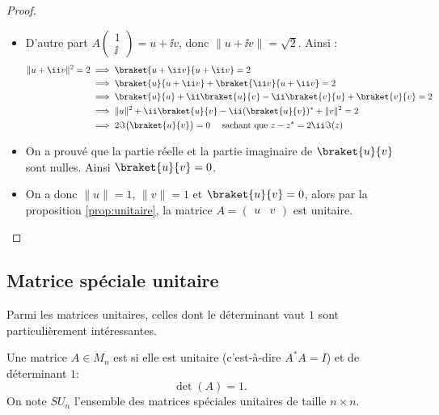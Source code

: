 \documentclass[11pt,class=report,crop=false]{standalone}
\begin{document}
\begin{proof}
\begin{itemize}
\begin{itemize}
  \item D'autre part $A \left(\begin{smallmatrix}1\\\ii\end{smallmatrix}\right) = u+\ii v$,
  donc $\|u+\ii v\| = \sqrt2$.
  Ainsi :
  \begin{align*}
  \|u+ \ii v\|^2 = 2 
   &\implies \braket{u+\ii v}{u+\ii v} = 2 \\
   &\implies \braket{u}{u+\ii v} + \braket{\ii v}{u+\ii v} = 2 \\
   &\implies \braket{u}{u} + \ii\braket{u}{v} -\ii\braket{v}{u} +\braket{v}{v} = 2 \\
   &\implies \|u\|^2 + \ii\braket{u}{v} - \ii(\braket{u}{v})^* + \|v\|^2 = 2 \\
   &\implies 2\Im\big( \braket{u}{v} \big) = 0 \quad \text{ sachant que } z-z^* = 2\ii\Im(z)\\
  \end{align*}
  
  \item On a prouvé que la partie réelle et la partie imaginaire de $\braket{u}{v}$ sont nulles. Ainsi $\braket{u}{v} = 0$.
  
  \item On a donc $\|u\|=1$, $\|v\|=1$ et $\braket{u}{v}=0$, alors par la proposition \ref{prop:unitaire}, la matrice $A = \begin{pmatrix}u & v\end{pmatrix}$ est unitaire.
\end{itemize}
\end{itemize}
\end{proof}



\subsection{Matrice spéciale unitaire}

Parmi les matrices unitaires, celles dont le déterminant vaut $1$ sont particulièrement intéressantes.

\begin{definition}
Une matrice $A \in M_n$ est  si elle est unitaire (c'est-à-dire $A^* A = I$) et de déterminant $1$: 
$$\det(A) = 1.$$ 
On note $SU_n$ l'ensemble des matrices spéciales unitaires de taille $n \times n$.
\end{definition}
\end{document}
